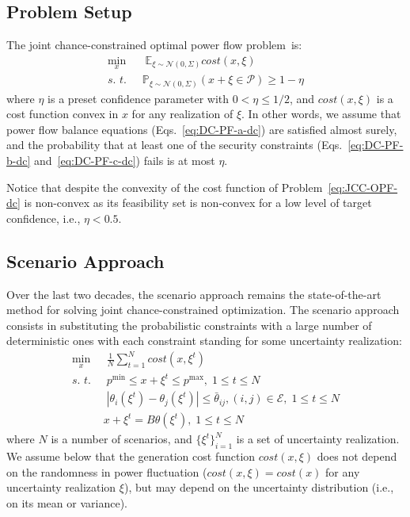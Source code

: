 \subsection{Problem Setup}
The joint chance-constrained optimal power flow problem~is:
\begin{equation}\label{eq:JCC-OPF-dc}
    \begin{aligned}
  \min_x & \;\mathbb{E}_{\xi\sim \mathcal{N}(0, \Sigma)} \textit{cost}(x,\xi)\\
   \textit{s. t. }\; & \mathbb{P}_{\xi\sim \mathcal{N}(0, \Sigma)} (x+\xi \in \mathcal{P}) \ge 1 - \eta
   \end{aligned}
\end{equation}
where $\eta$ is a preset confidence parameter with $0 < \eta \le 1/2$, and $\textit{cost}(x, \xi)$ is a cost function convex in $x$ for any realization of $\xi$. In other words, we assume that power flow balance equations (Eqs.~\eqref{eq:DC-PF-a-dc}) are satisfied almost surely, and the probability that at least one of the security constraints (Eqs.~\eqref{eq:DC-PF-b-dc} and~\eqref{eq:DC-PF-c-dc}) fails is at most $\eta$. 

Notice that despite the convexity of the cost function of Problem~\eqref{eq:JCC-OPF-dc} is non-convex as its feasibility set is non-convex for a low level of target confidence, i.e., $\eta < 0.5$.

\subsection{Scenario Approach}

Over the last two decades, the scenario approach \cite{nemirovski2006scenario,calafiore2006scenario} 
remains the state-of-the-art method for solving joint chance-constrained optimization. The scenario approach consists in substituting the probabilistic constraints with a large number of deterministic ones with each constraint standing for some uncertainty realization:
\begin{align}\label{eq:sc-opf-dc}
  \min_x & \; \frac{1}{N} \sum_{t=1}^N \textit{cost}(x,\xi^t)\\
  \textit{s. t. } & \; p^{\min} \le x+\xi^t \le p^{\max}, \; 1\le t \le N\nonumber\\
  & \; |\theta_i(\xi^t) - \theta_j(\xi^t)| \le {\bar \theta}_{ij}, (i, j)\in \mathcal{E}, \; 1\le t \le N\nonumber\\
  & x+\xi^t = B \theta(\xi^t), \; 1\le t \le N\nonumber
\end{align}
where $N$ is a number of scenarios, and $\{\xi^t\}_{i=1}^N$ is a set of uncertainty realization. We assume below that the generation cost function $\textit{cost}(x, \xi)$ does not depend on the randomness in power fluctuation ($\textit{cost}(x, \xi) = \textit{cost}(x)$ for any uncertainty realization $\xi$), but may depend on the uncertainty distribution (i.e., on its mean or variance). %

